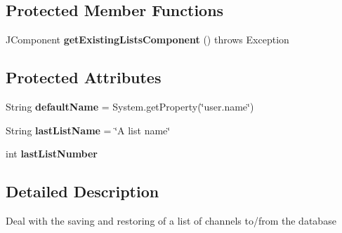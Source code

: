\subsection*{Protected Member Functions}
\begin{DoxyCompactItemize}
\item 
\hypertarget{classgov_1_1fnal_1_1ppd_1_1dd_1_1channel_1_1list_1_1SaveRestoreListOfChannels_a972821afb1b54dfdbca27195608515dd}{J\-Component {\bfseries get\-Existing\-Lists\-Component} ()  throws Exception }\label{classgov_1_1fnal_1_1ppd_1_1dd_1_1channel_1_1list_1_1SaveRestoreListOfChannels_a972821afb1b54dfdbca27195608515dd}

\end{DoxyCompactItemize}
\subsection*{Protected Attributes}
\begin{DoxyCompactItemize}
\item 
\hypertarget{classgov_1_1fnal_1_1ppd_1_1dd_1_1channel_1_1list_1_1SaveRestoreListOfChannels_a53fc1fa910b3fdb6367bb2131e0101d2}{String {\bfseries default\-Name} = System.\-get\-Property(\char`\"{}user.\-name\char`\"{})}\label{classgov_1_1fnal_1_1ppd_1_1dd_1_1channel_1_1list_1_1SaveRestoreListOfChannels_a53fc1fa910b3fdb6367bb2131e0101d2}

\item 
\hypertarget{classgov_1_1fnal_1_1ppd_1_1dd_1_1channel_1_1list_1_1SaveRestoreListOfChannels_ab7af798b223d81bf88344bd4691d44c0}{String {\bfseries last\-List\-Name} = \char`\"{}A list name\char`\"{}}\label{classgov_1_1fnal_1_1ppd_1_1dd_1_1channel_1_1list_1_1SaveRestoreListOfChannels_ab7af798b223d81bf88344bd4691d44c0}

\item 
\hypertarget{classgov_1_1fnal_1_1ppd_1_1dd_1_1channel_1_1list_1_1SaveRestoreListOfChannels_a05c358c578a733da611ca47ac0b6fb17}{int {\bfseries last\-List\-Number}}\label{classgov_1_1fnal_1_1ppd_1_1dd_1_1channel_1_1list_1_1SaveRestoreListOfChannels_a05c358c578a733da611ca47ac0b6fb17}

\end{DoxyCompactItemize}


\subsection{Detailed Description}
Deal with the saving and restoring of a list of channels to/from the database

